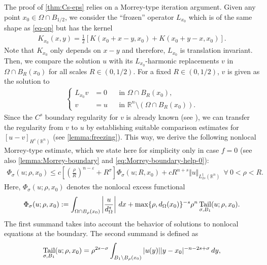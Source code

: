 \documentclass[11pt,reqno]{amsart}
\theoremstyle{plain}
\theoremstyle{definition}
\numberwithin{equation}{section}
\newcommand{\R}{\mathbb{R}}
\newcommand{\eps}{\varepsilon}
\newcommand{\1}{\mathbbm{1}}
\DeclareMathOperator{\tail}{Tail}
\renewcommand{\d}{\textnormal{\,d}}
\begin{document}
The proof of \autoref{thm:Cs-eps} relies on a Morrey-type iteration argument. Given any point $x_0 \in \Omega \cap B_{1/2}$, we consider the ``frozen'' operator $L_{x_0}$ which is of the same shape as \eqref{eq-op} but has the kernel
\begin{align}\label{eq-frozen}
    K_{x_0}(x,y) = \frac{1}{2}[K(x_0 + x - y , x_0) + K(x_0 + y - x , x_0)].
\end{align}
Note that $K_{x_0}$ only depends on $x-y$ and therefore, $L_{x_0}$ is translation invariant. Then, we compare the solution $u$ with its $L_{x_0}$-harmonic replacements $v$ in $\Omega \cap B_R(x_0)$ for all scales $R \in (0,1/2)$. For a fixed $R \in (0,1/2)$, $v$ is given as the solution to
\begin{align}
\label{eq:frozen-intro}
\left\{
\begin{aligned}
L_{x_0}v&=0 &&\text{in }\Omega \cap B_R(x_0),\\
v&=u &&\text{in }\R^n \setminus (\Omega \cap B_R(x_0)).
\end{aligned}
\right.
\end{align}
Since the $C^s$ boundary regularity for $v$ is already known (see \cite{FeRo24,RoWe24}), we can transfer the regularity from $v$ to $u$ by establishing suitable comparison estimates for $[u-v]_{H^s(\R^n)}$ (see \autoref{lemma:freezing}). This way, we derive the following nonlocal Morrey-type estimate, which we state here for simplicity only in case $f = 0$ (see also \autoref{lemma:Morrey-boundary} and \eqref{eq:Morrey-boundary-help-0}):
\begin{align}
\label{eq:Morrey-type-intro}
\Phi_\sigma(u; \rho,x_0) \le c \left[\left( \frac{\rho}{R} \right)^{n-\eps} + R^{\sigma} \right] \Phi_\sigma(u; R,x_0) + c R^{n+s} \Vert u \Vert_{L^1_{2s}(\R^n)} ~~ \forall ~ 0 < \rho < R.
\end{align}
Here, $\Phi_{\sigma}(u;\rho,x_0)$ denotes the nonlocal excess functional
\begin{align}\label{eq-excess-Phi}
    \Phi_\sigma(u; \rho,x_0) := \int_{\Omega \cap B_{\rho}(x_0)} \left| \frac{u}{d_{\Omega}^s} \right| \d x + \max\{\rho,d_{\Omega}(x_0)\}^{-s} \rho^n \tail_{\sigma,B_1}(u;\rho,x_0).
\end{align}
The first summand takes into account the behavior of solutions to nonlocal equations at the boundary. The second summand is defined as
\begin{align*}
    \tail_{\sigma,B_1}(u;\rho,x_0) = \rho^{2s-\sigma} \int_{B_1 \setminus B_{\rho}(x_0)} |u(y)||y-x_0|^{-n-2s+\sigma} \d y,
\end{align*}
\end{document}
